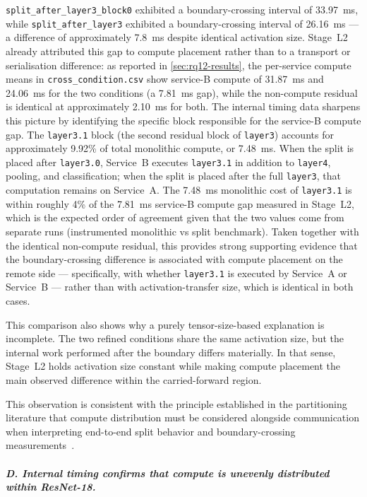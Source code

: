 \texttt{split\_after\_layer3\_block0} exhibited a boundary-crossing interval of 33.97~ms, while \texttt{split\_after\_layer3} exhibited a boundary-crossing interval of 26.16~ms --- a difference of approximately 7.8~ms despite identical activation size. Stage~L2 already attributed this gap to compute placement rather than to a transport or serialisation difference: as reported in \cref{sec:rq12-results}, the per-service compute means in \texttt{cross\_condition.csv} show service-B compute of 31.87~ms and 24.06~ms for the two conditions (a 7.81~ms gap), while the non-compute residual is identical at approximately 2.10~ms for both. The internal timing data sharpens this picture by identifying the specific block responsible for the service-B compute gap. The \texttt{layer3.1} block (the second residual block of \texttt{layer3}) accounts for approximately 9.92\% of total monolithic compute, or 7.48~ms. When the split is placed after \texttt{layer3.0}, Service~B executes \texttt{layer3.1} in addition to \texttt{layer4}, pooling, and classification; when the split is placed after the full \texttt{layer3}, that computation remains on Service~A. The 7.48~ms monolithic cost of \texttt{layer3.1} is within roughly 4\% of the 7.81~ms service-B compute gap measured in Stage~L2, which is the expected order of agreement given that the two values come from separate runs (instrumented monolithic vs split benchmark). Taken together with the identical non-compute residual, this provides strong supporting evidence that the boundary-crossing difference is associated with compute placement on the remote side --- specifically, with whether \texttt{layer3.1} is executed by Service~A or Service~B --- rather than with activation-transfer size, which is identical in both cases.

This comparison also shows why a purely tensor-size-based explanation is incomplete. The two refined conditions share the same activation size, but the internal work performed after the boundary differs materially. In that sense, Stage~L2 holds activation size constant while making compute placement the main observed difference within the carried-forward region.

This observation is consistent with the principle established in the partitioning literature that compute distribution must be considered alongside communication when interpreting end-to-end split behavior and boundary-crossing measurements~\cite{dnnsplit, dads, fine_grained_partitioning}.

\subparagraph{D. Internal timing confirms that compute is unevenly distributed within ResNet-18.}

